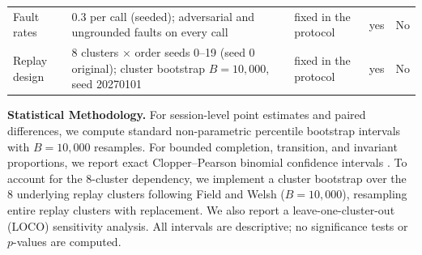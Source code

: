 \documentclass[runningheads,a4paper]{llncs}
\begin{document}
\begin{table}[!htbp]
\begin{tabular}{@{}L{1.5cm}L{3.7cm}L{2.8cm}L{1.2cm}L{2.2cm}@{}}
Fault rates & 0.3 per call (seeded); adversarial and ungrounded faults on every call & fixed in the protocol & yes & No\\
Replay design & 8 clusters $\times$ order seeds 0--19 (seed 0 original); cluster bootstrap $B=10{,}000$, seed 20270101 & fixed in the protocol & yes & No\\
\bottomrule
\end{tabular}
\end{table}

\textbf{Statistical Methodology.} For session-level point estimates and paired differences, we compute standard non-parametric percentile bootstrap intervals with $B=10{,}000$ resamples. For bounded completion, transition, and invariant proportions, we report exact Clopper--Pearson binomial confidence intervals \cite{clopper1934}. To account for the 8-cluster dependency, we implement a cluster bootstrap over the 8 underlying replay clusters following Field and Welsh \cite{field2007} ($B=10{,}000$), resampling entire replay clusters with replacement. We also report a leave-one-cluster-out (LOCO) sensitivity analysis. All intervals are descriptive; no significance tests or $p$-values are computed.
\end{document}
